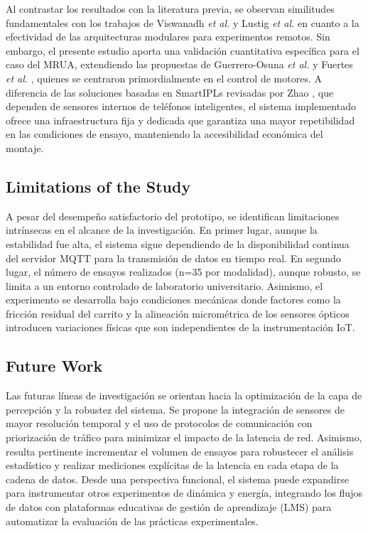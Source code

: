 \documentclass[journal,article,submit,pdftex]{Definitions/mdpi}
\begin{document}
Al contrastar los resultados con la literatura previa, se observan similitudes fundamentales con los trabajos de Viswanadh \textit{et al.} \cite{r2} y Lustig \textit{et al.} \cite{r5} en cuanto a la efectividad de las arquitecturas modulares para experimentos remotos. Sin embargo, el presente estudio aporta una validación cuantitativa específica para el caso del MRUA, extendiendo las propuestas de Guerrero-Osuna \textit{et al.} \cite{r4} y Fuertes \textit{et al.} \cite{r3}, quienes se centraron primordialmente en el control de motores. A diferencia de las soluciones basadas en SmartIPLs revisadas por Zhao \cite{r6}, que dependen de sensores internos de teléfonos inteligentes, el sistema implementado ofrece una infraestructura fija y dedicada que garantiza una mayor repetibilidad en las condiciones de ensayo, manteniendo la accesibilidad económica del montaje.

\subsection{Limitations of the Study}

A pesar del desempeño satisfactorio del prototipo, se identifican limitaciones intrínsecas en el alcance de la investigación. En primer lugar, aunque la estabilidad fue alta, el sistema sigue dependiendo de la disponibilidad continua del servidor MQTT para la transmisión de datos en tiempo real. En segundo lugar, el número de ensayos realizados (n=35 por modalidad), aunque robusto, se limita a un entorno controlado de laboratorio universitario. Asimismo, el experimento se desarrolla bajo condiciones mecánicas donde factores como la fricción residual del carrito y la alineación micrométrica de los sensores ópticos introducen variaciones físicas que son independientes de la instrumentación IoT.

\subsection{Future Work}

Las futuras líneas de investigación se orientan hacia la optimización de la capa de percepción y la robustez del sistema. Se propone la integración de sensores de mayor resolución temporal y el uso de protocolos de comunicación con priorización de tráfico para minimizar el impacto de la latencia de red. Asimismo, resulta pertinente incrementar el volumen de ensayos para robustecer el análisis estadístico y realizar mediciones explícitas de la latencia en cada etapa de la cadena de datos. Desde una perspectiva funcional, el sistema puede expandirse para instrumentar otros experimentos de dinámica y energía, integrando los flujos de datos con plataformas educativas de gestión de aprendizaje (LMS) para automatizar la evaluación de las prácticas experimentales.
\end{document}
